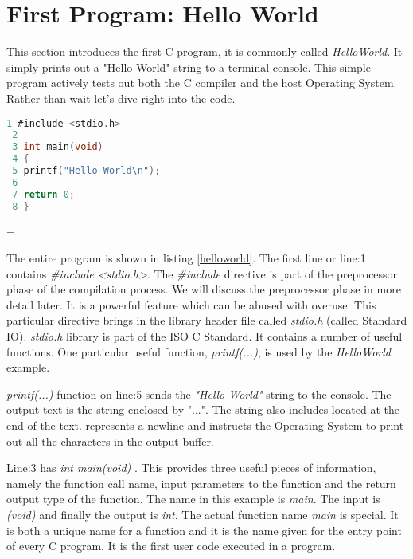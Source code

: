 \section{First Program: Hello World} \label{first}

This section introduces the first C program, it is commonly called \textit{HelloWorld}. It simply prints out a "Hello World" string to a terminal console. This simple program actively tests out both the C compiler and the host Operating System.\\ 

Rather than wait let's dive right into the code.\\

\begin{lstlisting}[language=C,showstringspaces=false,caption={File hellow1.c, C Hello World example},captionpos=b,label=helloworld]
 1 #include <stdio.h>
 2 
 3 int main(void)
 4 {
 5 printf("Hello World\n");
 6
 7 return 0;
 8 }
\end{lstlisting}

\parskip = \baselineskip

The entire program is shown in listing \ref{helloworld}. The first line or line:1 contains \textit{\#include \textless stdio.h\textgreater}. The \textit{\#include} directive is part of the preprocessor phase of the compilation process. We will discuss the preprocessor phase in more detail later. It is a powerful feature which can be abused with overuse. This particular directive brings in the library header file called \textit{stdio.h} (called Standard IO). \textit{stdio.h}  library is part of the ISO C Standard. It contains a number of useful functions. One particular useful function, \textit{printf(...)}, is used by the \textit{HelloWorld} example.

 \textit{printf(...)} function  on line:5 sends the \textit{"Hello World"} string to the console. The output text is the string enclosed by "...". The string also includes  located at the end of the text.  represents a newline and instructs the Operating System to print out all the characters in the output buffer.

Line:3 has \textit{int main(void)} . This provides three useful pieces of information, namely the function call name, input parameters to the function and the return output type of the function. The name in this example is \textit{main}. The input is \textit{(void)} and finally the output is \textit{int}. The actual function name \textit{main} is special. It is both a unique name for a function and it is the name given for the entry point of every C program. It is the first user code executed in a program.

